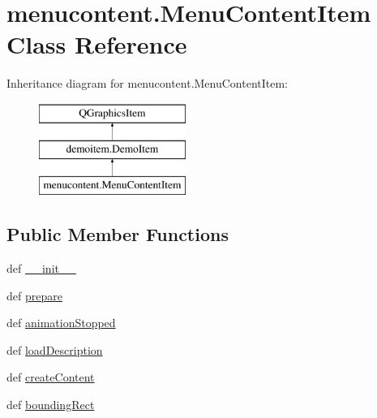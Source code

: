 \hypertarget{classmenucontent_1_1MenuContentItem}{}\section{menucontent.\+Menu\+Content\+Item Class Reference}
\label{classmenucontent_1_1MenuContentItem}
Inheritance diagram for menucontent.\+Menu\+Content\+Item\+:\begin{figure}[H]
\begin{center}
\leavevmode
\includegraphics[height=3.000000cm]{classmenucontent_1_1MenuContentItem}
\end{center}
\end{figure}
\subsection*{Public Member Functions}
\begin{DoxyCompactItemize}
\item 
def \hyperlink{classmenucontent_1_1MenuContentItem_ac5cf8f2f8cf3a4ba5775c75179211898}{\+\_\+\+\_\+init\+\_\+\+\_\+}
\item 
def \hyperlink{classmenucontent_1_1MenuContentItem_a0ce5ed93c987cc474eae8975a9952932}{prepare}
\item 
def \hyperlink{classmenucontent_1_1MenuContentItem_aa49d2bd1d1dee5d9727e75cf79bcbc0c}{animation\+Stopped}
\item 
def \hyperlink{classmenucontent_1_1MenuContentItem_a0aade108af56c0e77a57fdd5304bc571}{load\+Description}
\item 
def \hyperlink{classmenucontent_1_1MenuContentItem_a74746107199631ee92f7e25d9c0bd899}{create\+Content}
\item 
def \hyperlink{classmenucontent_1_1MenuContentItem_a630bb7c2ea128bde70619de63287d037}{bounding\+Rect}
\end{DoxyCompactItemize}
